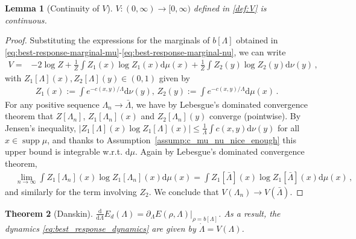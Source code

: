 \documentclass[11pt,a4paper,final]{article}
\DeclareMathOperator{\supp}{supp}
\renewcommand{\d}{\mathrm{d}}
\newcommand{\1}{\mathbf{1}}
\theoremstyle{plain}
\newtheorem{theorem}{Theorem}
\newtheorem{lemma}[theorem]{Lemma}
\numberwithin{equation}{section}
\numberwithin{theorem}{section}
\begin{document}
\begin{lemma}[Continuity of $V$]\label{lem:continuity_V}
    $V:(0,\infty)\to[0,\infty)$ defined in \eqref{def:V} is continuous.
\end{lemma}
\begin{proof}
    Substituting the expressions for the marginals of $b[\Lambda]$ obtained in \eqref{eq:best-response-marginal-mu}-\eqref{eq:best-response-marginal-nu}, we can write
\begin{align}\label{eq:V-in-Z}
    V=&-2\log Z+\frac{1}{Z} \int Z_1(x)\log Z_1(x)\d\mu(x) 
    + \frac{1}{Z} \int Z_2(y)\log Z_2(y)\d\nu(y)\,,
\end{align}
with $Z_1[\Lambda](x), Z_2[\Lambda](y)\in (0,1)$ given by
\begin{align*}
Z_1(x):= \int e^{-c(x,y)/\Lambda}\d\nu(y),\, Z_2(y):= \int e^{-c(x,y)/\Lambda}\d\mu(x) \,.
\end{align*}
For any positive sequence $\Lambda_n\to\bar\Lambda$, we have by Lebesgue's dominated convergence theorem that $Z[\Lambda_n]$, $Z_1[\Lambda_n](x)$ and $Z_2[\Lambda_n](y)$ converge (pointwise). By Jensen's inequality, $|Z_1[\Lambda](x)\log Z_1[\Lambda](x)|\le \frac{1}{\Lambda} \int c(x,y)\d\nu(y)$  for all $x\in \supp\mu$, and thanks to Assumption~\ref{assump:c_mu_nu_nice_enough} this upper bound is integrable w.r.t. $\d\mu$. Again by Lebesgue's dominated convergence theorem, 
\begin{align*}
    &\lim_{n\to\infty}\int Z_1[\Lambda_n](x)\log Z_1[\Lambda_n](x)\d\mu(x)
    = \int Z_1[\bar\Lambda](x)\log Z_1[\bar\Lambda](x)\d\mu(x)\,,
\end{align*}
and similarly for the term involving $Z_2$. We conclude that $V(\Lambda_n)\to V(\bar\Lambda)$.
\end{proof}
\begin{theorem}[Danskin]\label{thm:danskin}
$   \frac{\d}{\d \Lambda} E_d(\Lambda) = \partial_\Lambda E(\rho,\Lambda)|_{\rho=b[\Lambda]}$. As a result, the dynamics \eqref{eq:best_response_dynamics} are given by $\dot\Lambda=V(\Lambda)$.
\end{theorem}
\end{document}
